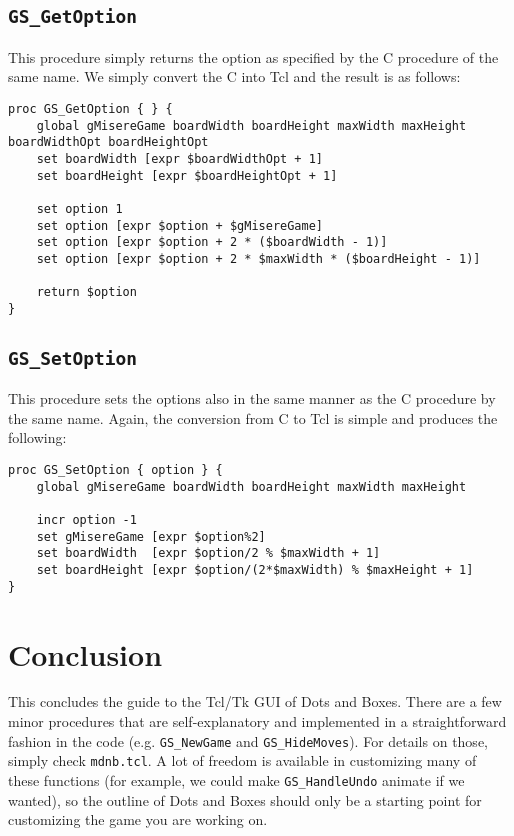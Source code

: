 \documentclass{article}
\begin{document}
\subsection{\texttt{GS\_GetOption}}

This procedure simply returns the option as specified by the C procedure of the same name. We simply convert the C into Tcl and the result is as follows:

\begin{verbatim}
proc GS_GetOption { } {
    global gMisereGame boardWidth boardHeight maxWidth maxHeight boardWidthOpt boardHeightOpt
    set boardWidth [expr $boardWidthOpt + 1]
    set boardHeight [expr $boardHeightOpt + 1]

    set option 1
    set option [expr $option + $gMisereGame]
    set option [expr $option + 2 * ($boardWidth - 1)]
    set option [expr $option + 2 * $maxWidth * ($boardHeight - 1)]

    return $option
}
\end{verbatim}

\subsection{\texttt{GS\_SetOption}}

This procedure sets the options also in the same manner as the C procedure by the same name. Again, the conversion from C to Tcl is simple and produces the following:

\begin{verbatim}
proc GS_SetOption { option } {
    global gMisereGame boardWidth boardHeight maxWidth maxHeight

    incr option -1
    set gMisereGame [expr $option%2]
    set boardWidth  [expr $option/2 % $maxWidth + 1]
    set boardHeight [expr $option/(2*$maxWidth) % $maxHeight + 1]
}
\end{verbatim}


\section{Conclusion}

This concludes the guide to the Tcl/Tk GUI of Dots and Boxes. There are a few minor procedures that are self-explanatory and implemented in a straightforward fashion in the code (e.g. \texttt{GS\_NewGame} and \texttt{GS\_HideMoves}). For details on those, simply check \texttt{mdnb.tcl}. A lot of freedom is available in customizing many of these functions (for example, we could make \texttt{GS\_HandleUndo} animate if we wanted), so the outline of Dots and Boxes should only be a starting point for customizing the game you are working on.
\end{document}
